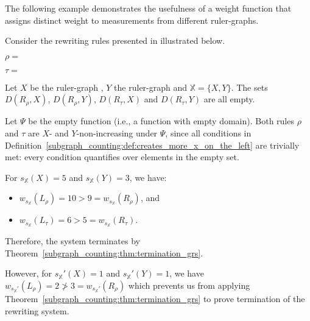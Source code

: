 The following example demonstrates the usefulness of a weight function that assigns distinct weight to measurements from different ruler-graphs.
\begin{example} 
    \label{ex:overbeek_5d6}
    Consider the rewriting rules presented in \cite[Example 5.6]{overbeek2024termination_lmcs} illustrated 
    below.
    \begin{center}
        \begin{center} 
          $\rho\mathop{=}$\scalebox{0.8}{}
        \end{center}
        \begin{center}
        $\tau\mathop{=}$\scalebox{0.8}{
        }
        \end{center}
      \end{center}
     Let $X$ be the ruler-graph
    , $Y$ the ruler-graph 
     and $\mathbb{X}\mathop{=}\{X, Y\}$.
    The sets $D(R_\rho, X)$, $D(R_\rho, Y)$, $D(R_\tau, X)$ and $D(R_\tau, Y)$ are all empty. 
    
    Let $\Psi$ be the empty function (i.e., a function with empty domain).
    Both rules $\rho$ and $\tau$ are $X$- and $Y$-non-increasing under $\Psi$,
    since all conditions in Definition~\ref{subgraph_counting:def:creates_more_x_on_the_left} are trivially met: every condition quantifies over elements in the empty set.
    
    For $s_\mathbb{X}(X)\mathop{=}5$ and $s_\mathbb{X}(Y)\mathop{=}3$, we have:
    \begin{itemize}
       \item $w_{s_\mathbb{X}}(L_\rho)\mathop{=}10\mathop{>}9\mathop{=}w_{s_\mathbb{X}}(R_\rho)$, and
       \item $w_{s_\mathbb{X}}(L_\tau)\mathop{=}6\mathop{>}5\mathop{=}w_{s_\mathbb{X}}(R_\tau)$.
    \end{itemize}
    Therefore, the system terminates by Theorem~\ref{subgraph_counting:thm:termination_grs}.

  However, for $s_\mathbb{X}'(X)\mathop{=}1$ and $s_\mathbb{X}'(Y)\mathop{=}1$, we have
    \(
        w_{s_\mathbb{X}'}(L_\rho)\mathop{=}2   \ngtr 3\mathop{=}w_{s_\mathbb{X}'}(R_\rho)
    \) which prevents us from applying Theorem~\ref{subgraph_counting:thm:termination_grs} to prove termination of the rewriting system.
\end{example}

